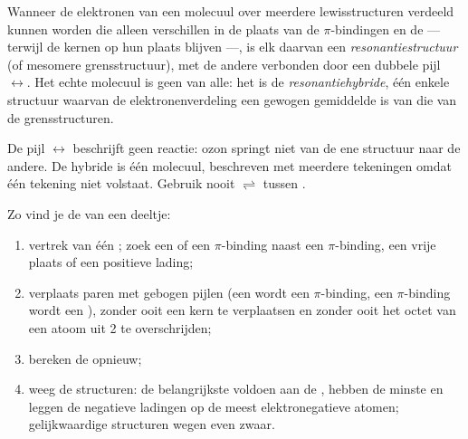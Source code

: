 \begin{definition}\label{def:b1:lewis-resonance-vsepr:resonance}
Wanneer de elektronen van een molecuul over meerdere lewisstructuren
verdeeld kunnen worden die alleen verschillen in de plaats van de
$\pi$-bindingen en de  --- terwijl de kernen op hun plaats
blijven ---, is elk daarvan een
\emph{resonantiestructuur} (of mesomere
grensstructuur), met de andere verbonden door een dubbele pijl
$\leftrightarrow$. Het echte molecuul is geen van alle: het is de
\emph{resonantiehybride}, één enkele structuur
waarvan de elektronenverdeling een gewogen gemiddelde is van die van de
grensstructuren.
\end{definition}

\begin{remark}\label{rem:b1:lewis-resonance-vsepr:arrow}
De pijl $\leftrightarrow$ beschrijft geen reactie: ozon springt niet van
de ene structuur naar de andere. De hybride is één molecuul, beschreven
met meerdere tekeningen omdat één tekening niet volstaat. Gebruik nooit
$\rightleftharpoons$ tussen .
\end{remark}

\begin{method}\label{met:b1:lewis-resonance-vsepr:resonance}
Zo vind je de  van een deeltje:
\begin{enumerate}
  \item vertrek van één ; zoek een  of een
        $\pi$-binding naast een $\pi$-binding, een vrije plaats of een
        positieve lading;
  \item verplaats paren met gebogen pijlen (een  wordt een
        $\pi$-binding, een $\pi$-binding wordt een ), zonder ooit
        een kern te verplaatsen en zonder ooit het octet van een atoom
        uit  2 te overschrijden;
  \item bereken de  opnieuw;
  \item weeg de structuren: de belangrijkste voldoen aan de ,
        hebben de minste  en leggen de negatieve ladingen
        op de meest elektronegatieve atomen; gelijkwaardige structuren
        wegen even zwaar.
\end{enumerate}
\end{method}

